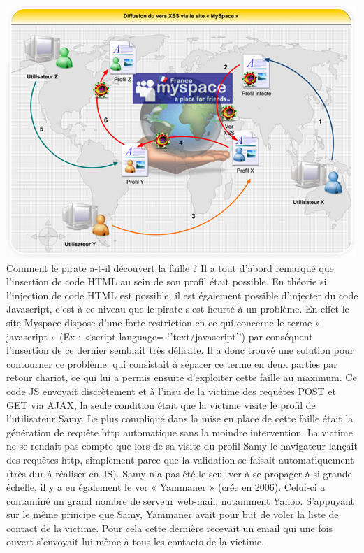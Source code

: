\documentclass[a4paper,12pt]{report}
\begin{document}
\includegraphics{images/versmyspace.jpg}\\

Comment le pirate a-t-il découvert la faille ?
Il a tout d’abord remarqué que l’insertion de code HTML au sein de son profil était possible. En théorie si l’injection de code HTML est possible, il est également possible d’injecter du code Javascript, c’est à ce niveau que le pirate s’est heurté à un problème. En effet le site Myspace dispose d’une forte restriction en ce qui concerne le terme « javascript » (Ex : <script language= ‘’text/javascript’’) par conséquent l’insertion de ce dernier semblait très délicate. Il a donc trouvé une solution pour contourner ce problème, qui consistait à séparer ce terme en deux parties par retour chariot, ce qui lui a permis ensuite d’exploiter cette faille au maximum.
Ce code JS envoyait discrètement et à l’insu de la victime des requêtes POST et GET via AJAX, la seule condition était que la victime visite le profil de l’utilisateur Samy. Le plus compliqué dans la mise en place de cette faille était la génération de requête http automatique sans la moindre intervention. La victime ne se rendait pas compte que lors de sa visite du profil Samy le navigateur lançait des requêtes http, simplement parce que la validation se faisait automatiquement (très dur à réaliser en JS).
Samy n’a pas été le seul ver à se propager à si grande échelle, il y a eu également le ver « Yammaner » (crée en 2006). Celui-ci a contaminé un grand nombre de serveur web-mail, notamment Yahoo. S’appuyant sur le même principe que Samy, Yammaner avait pour but de voler la liste de contact de la victime. Pour cela cette dernière recevait un email qui une fois ouvert s’envoyait lui-même à tous les contacts de la victime.
\end{document}
